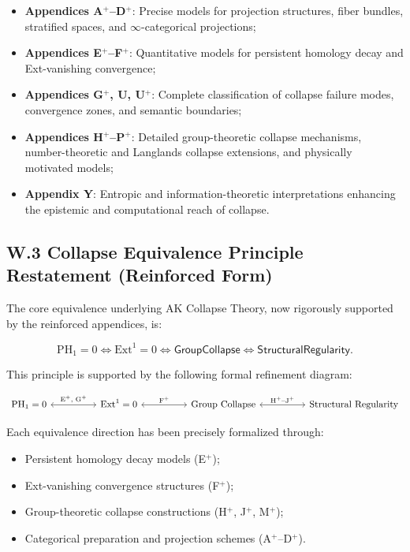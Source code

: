 \documentclass[11pt]{article}
\begin{document}
\begin{itemize}
    \item \textbf{Appendices A$^{+}$–D$^{+}$}: Precise models for projection structures, fiber bundles, stratified spaces, and $\infty$-categorical projections;
    \item \textbf{Appendices E$^{+}$–F$^{+}$}: Quantitative models for persistent homology decay and Ext-vanishing convergence;
    \item \textbf{Appendices G$^{+}$, U, U$^{+}$}: Complete classification of collapse failure modes, convergence zones, and semantic boundaries;
    \item \textbf{Appendices H$^{+}$–P$^{+}$}: Detailed group-theoretic collapse mechanisms, number-theoretic and Langlands collapse extensions, and physically motivated models;
    \item \textbf{Appendix Y}: Entropic and information-theoretic interpretations enhancing the epistemic and computational reach of collapse.
\end{itemize}

\subsection*{W.3 Collapse Equivalence Principle Restatement (Reinforced Form)}

The core equivalence underlying AK Collapse Theory, now rigorously supported by the reinforced appendices, is:

\[
\mathrm{PH}_1 = 0 \iff \mathrm{Ext}^1 = 0 \iff \mathsf{GroupCollapse} \iff \mathsf{StructuralRegularity}.
\]

This principle is supported by the following formal refinement diagram:

\[
\begin{tikzcd}[column sep=huge]
\mathrm{PH}_1 = 0 \arrow[leftrightarrow]{r}{\text{E$^{+}$, G$^{+}$}} 
& \mathrm{Ext}^1 = 0 \arrow[leftrightarrow]{r}{\text{F$^{+}$}} 
& \text{Group Collapse} \arrow[leftrightarrow]{r}{\text{H$^{+}$–J$^{+}$}} 
& \text{Structural Regularity}
\end{tikzcd}
\]

Each equivalence direction has been precisely formalized through:

\begin{itemize}
    \item Persistent homology decay models (E$^{+}$);
    \item Ext-vanishing convergence structures (F$^{+}$);
    \item Group-theoretic collapse constructions (H$^{+}$, J$^{+}$, M$^{+}$);
    \item Categorical preparation and projection schemes (A$^{+}$–D$^{+}$).
\end{itemize}
\end{document}
